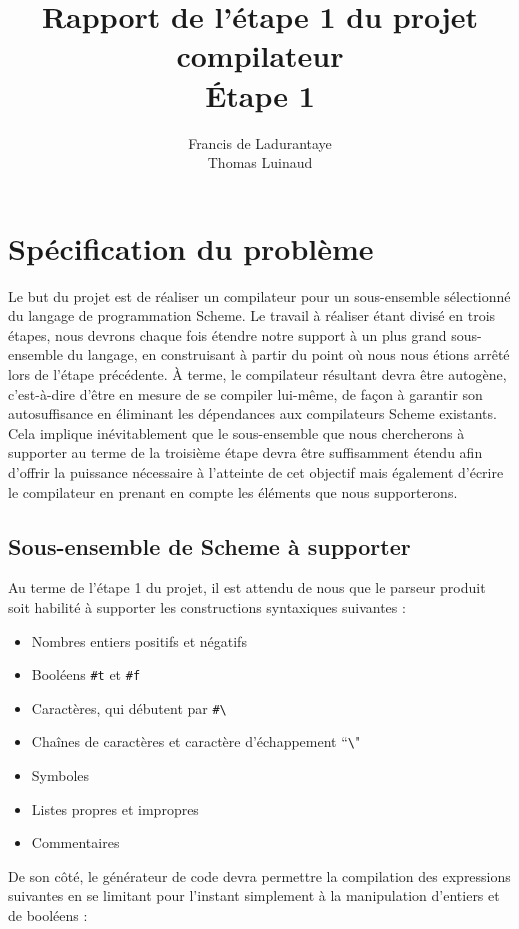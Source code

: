 \documentclass[12pt]{article}
\title{Rapport de l'étape 1 du projet compilateur \\ Étape 1}
\author{Francis de Ladurantaye \\ Thomas Luinaud}
\begin{document}
\begin{titlepage}
  \maketitle
\end{titlepage}


\section{Spécification du problème}
Le but du projet est de réaliser un compilateur pour un sous-ensemble sélectionné du langage de programmation Scheme. Le travail à réaliser étant divisé en trois étapes, nous devrons chaque fois étendre notre support à un plus grand sous-ensemble du langage, en construisant à partir du point où nous nous étions arrêté lors de l'étape précédente. À terme, le compilateur résultant devra être autogène, c'est-à-dire d'être en mesure de se compiler lui-même, de façon à garantir son autosuffisance en éliminant les dépendances aux compilateurs Scheme existants. Cela implique inévitablement que le sous-ensemble que nous chercherons à supporter au terme de la troisième étape devra être suffisamment étendu afin d'offrir la puissance nécessaire à l'atteinte de cet objectif mais également d'écrire le compilateur en prenant en compte les éléments que nous supporterons.

\subsection{Sous-ensemble de Scheme à supporter}
Au terme de l'étape 1 du projet, il est attendu de nous que le parseur produit soit habilité à supporter les constructions syntaxiques suivantes :

\begin{itemize}
\item Nombres entiers positifs et négatifs
\item Booléens \texttt{\#t} et \texttt{\#f}
\item Caractères, qui débutent par \texttt{\#\textbackslash}
\item Chaînes de caractères et caractère d'échappement ``\texttt{\textbackslash}"
\item Symboles
\item Listes propres et impropres
\item Commentaires
\end{itemize}

De son côté, le générateur de code devra permettre la compilation des expressions suivantes en se limitant pour l'instant simplement à la manipulation d'entiers et de booléens :
\end{document}
